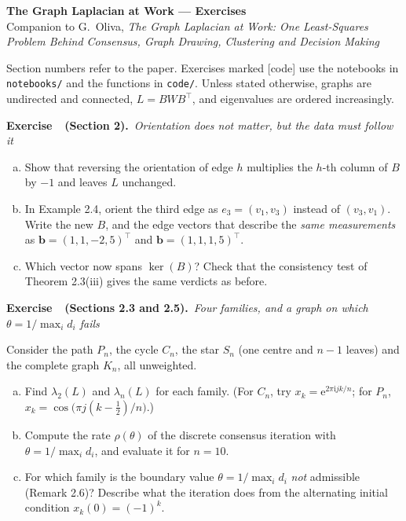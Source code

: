 \documentclass[11pt]{article}
\newcommand{\Ker}{\operatorname{ker}}
\newcounter{ex}
\newenvironment{exercise}[2]{\refstepcounter{ex}\par\bigskip\noindent
  \textbf{Exercise \theex\ \,(#1).}\ \emph{#2}\par\smallskip}{\par}
\begin{document}
\begin{center}
{\Large\bfseries The Graph Laplacian at Work --- Exercises}\\[4pt]
Companion to G.~Oliva, \emph{The Graph Laplacian at Work: One Least-Squares
Problem Behind Consensus, Graph Drawing, Clustering and Decision Making}
\end{center}

\noindent Section numbers refer to the paper. Exercises marked
\textsf{[code]} use the notebooks in \texttt{notebooks/} and the functions in
\texttt{code/}. Unless stated otherwise,
graphs are undirected and connected, $L=BWB^\top$, and eigenvalues are
ordered increasingly.

\begin{exercise}{Section 2}{Orientation does not matter, but the data must follow it}
\begin{enumerate}[(a)]
\item Show that reversing the orientation of edge $h$ multiplies the $h$-th
column of $B$ by $-1$ and leaves $L$ unchanged.
\item In Example 2.4, orient the third edge as $e_3=(v_1,v_3)$ instead of
$(v_3,v_1)$. Write the new $B$, and the edge vectors that describe the
\emph{same measurements} as $\bm b=(1,1,-2,5)^\top$ and $\bm b=(1,1,1,5)^\top$.
\item Which vector now spans $\Ker(B)$? Check that the consistency test of
Theorem 2.3(iii) gives the same verdicts as before.
\end{enumerate}
\end{exercise}

\begin{exercise}{Sections 2.3 and 2.5}{Four families, and a graph on which
$\theta=1/\max_i d_i$ fails}
Consider the path $P_n$, the cycle $C_n$, the star $S_n$ (one centre and $n-1$
leaves) and the complete graph $K_n$, all unweighted.
\begin{enumerate}[(a)]
\item Find $\lambda_2(L)$ and $\lambda_n(L)$ for each family. (For $C_n$, try
$x_k=\mathrm e^{2\pi\mathrm i jk/n}$; for $P_n$, $x_k=\cos\big(\pi j(k-\tfrac12)/n\big)$.)
\item Compute the rate $\rho(\theta)$ of the discrete consensus iteration with
$\theta=1/\max_i d_i$, and evaluate it for $n=10$.
\item For which family is the boundary value $\theta=1/\max_i d_i$ \emph{not}
admissible (Remark 2.6)? Describe what the iteration does from the
alternating initial condition $x_k(0)=(-1)^k$.
\end{enumerate}
\end{exercise}
\end{document}
